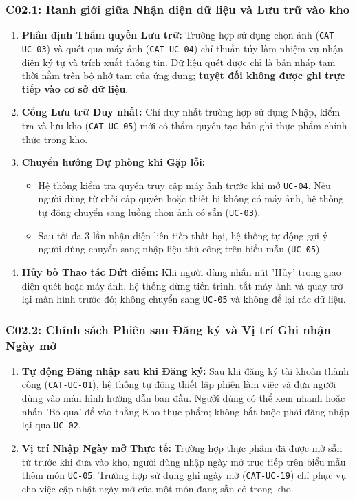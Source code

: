 \documentclass[10pt,a4paper]{article}
\begin{document}
\subsubsection{C02.1: Ranh giới giữa Nhận diện dữ liệu và Lưu trữ vào kho}
\begin{enumerate}[itemsep=2pt]
    \item \textbf{Phân định Thẩm quyền Lưu trữ:} Trường hợp sử dụng chọn ảnh (\texttt{CAT-UC-03}) và quét qua máy ảnh (\texttt{CAT-UC-04}) chỉ thuần túy làm nhiệm vụ nhận diện ký tự và trích xuất thông tin. Dữ liệu quét được chỉ là bản nháp tạm thời nằm trên bộ nhớ tạm của ứng dụng; \textbf{tuyệt đối không được ghi trực tiếp vào cơ sở dữ liệu}.
    \item \textbf{Cổng Lưu trữ Duy nhất:} Chỉ duy nhất trường hợp sử dụng Nhập, kiểm tra và lưu kho (\texttt{CAT-UC-05}) mới có thẩm quyền tạo bản ghi thực phẩm chính thức trong kho.
    \item \textbf{Chuyển hướng Dự phòng khi Gặp lỗi:}
    \begin{itemize}
        \item Hệ thống kiểm tra quyền truy cập máy ảnh trước khi mở \texttt{UC-04}. Nếu người dùng từ chối cấp quyền hoặc thiết bị không có máy ảnh, hệ thống tự động chuyển sang luồng chọn ảnh có sẵn (\texttt{UC-03}).
        \item Sau tối đa 3 lần nhận diện liên tiếp thất bại, hệ thống tự động gợi ý người dùng chuyển sang nhập liệu thủ công trên biểu mẫu (\texttt{UC-05}).
    \end{itemize}
    \item \textbf{Hủy bỏ Thao tác Dứt điểm:} Khi người dùng nhấn nút 'Hủy' trong giao diện quét hoặc máy ảnh, hệ thống dừng tiến trình, tắt máy ảnh và quay trở lại màn hình trước đó; không chuyển sang \texttt{UC-05} và không để lại rác dữ liệu.
\end{enumerate}

\subsubsection{C02.2: Chính sách Phiên sau Đăng ký và Vị trí Ghi nhận Ngày mở}
\begin{enumerate}[itemsep=2pt]
    \item \textbf{Tự động Đăng nhập sau khi Đăng ký:} Sau khi đăng ký tài khoản thành công (\texttt{CAT-UC-01}), hệ thống tự động thiết lập phiên làm việc và đưa người dùng vào màn hình hướng dẫn ban đầu. Người dùng có thể xem nhanh hoặc nhấn 'Bỏ qua' để vào thẳng Kho thực phẩm; không bắt buộc phải đăng nhập lại qua \texttt{UC-02}.
    \item \textbf{Vị trí Nhập Ngày mở Thực tế:} Trường hợp thực phẩm đã được mở sẵn từ trước khi đưa vào kho, người dùng nhập ngày mở trực tiếp trên biểu mẫu thêm món \texttt{UC-05}. Trường hợp sử dụng ghi ngày mở (\texttt{CAT-UC-19}) chỉ phục vụ cho việc cập nhật ngày mở của một món đang sẵn có trong kho.
\end{enumerate}
\end{document}
